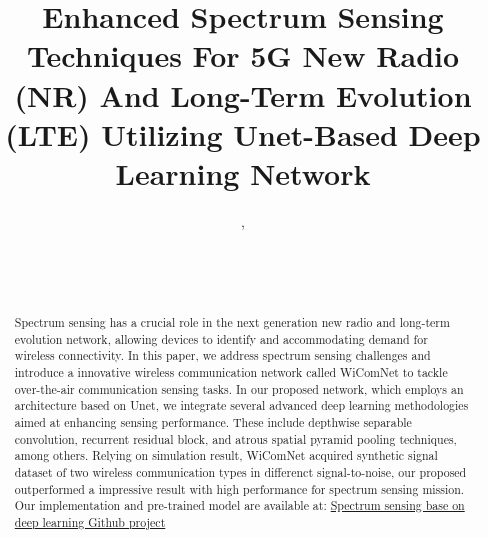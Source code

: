 \documentclass[journal]{IEEEtran} %
\begin{document}
\title{Enhanced Spectrum Sensing Techniques For 5G New Radio (NR) And Long-Term Evolution (LTE) Utilizing Unet-Based Deep Learning Network\\
}

\author{%
    , %
    \\%
    \\%
    \\%
     \\
}

\maketitle

\begin{abstract}
Spectrum sensing has a crucial role in the next generation new radio and long-term evolution network, allowing devices to identify and accommodating demand for wireless connectivity. In this paper, we address spectrum sensing challenges and introduce a innovative wireless communication network called WiComNet to tackle over-the-air communication sensing tasks. In our proposed network, which employs an architecture based on Unet, we integrate several advanced deep learning methodologies aimed at enhancing sensing performance. These include depthwise separable convolution, recurrent residual block, and atrous spatial pyramid pooling techniques, among others. Relying on simulation result, WiComNet acquired synthetic signal dataset of two wireless communication types in differenct signal-to-noise, our proposed outperformed a impressive result with high performance for spectrum sensing mission. Our implementation and pre-trained model are available at:
    \href{https://github.com/Winxkin/Spectrum_sensing_base_on_Deep_learning.git}{Spectrum sensing base on deep learning Github project}
\end{abstract}
\end{document}
